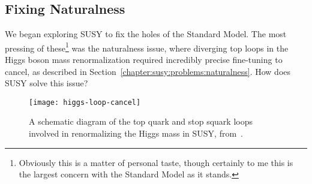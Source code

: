 



\subsection{Fixing Naturalness}

We began exploring SUSY to fix the holes of the Standard Model. The most pressing of these\footnote{Obviously this is a matter of personal taste, though certainly to me this is the largest concern with the Standard Model as it stands.} was the naturalness issue, where diverging top loops in the Higgs boson mass renormalization required incredibly precise fine-tuning to cancel, as described in Section~\ref{chapter:susy:problems:naturalness}. How does SUSY solve this issue?


\begin{figure}
\centering
\texttt{[image: higgs-loop-cancel]}
\label{fig:susy:higgs-loop-cancel}
\caption{A schematic diagram of the top quark and stop squark loops involved in renormalizing the Higgs mass in SUSY, from~\cite{Martin1997}.}
\end{figure}


